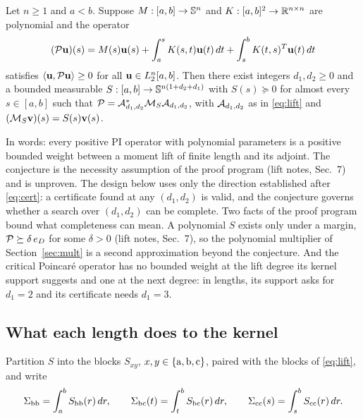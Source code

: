 \begin{conjecture}\label{conj}
Let $n\ge1$ and $a<b$. Suppose $M:[a,b]\to\mathbb{S}^n$ and $K:[a,b]^2\to\mathbb{R}^{n\times n}$ are polynomial and the operator
\[
(\mathcal{P}\mathbf{u})(s)=M(s)\mathbf{u}(s)+\int_a^sK(s,t)\mathbf{u}(t)\,dt+\int_s^bK(t,s)^T\mathbf{u}(t)\,dt
\]
satisfies $\left\langle \mathbf{u},\mathcal{P}\mathbf{u}\right\rangle\ge0$ for all $\mathbf{u}\in L_2^n[a,b]$. Then there exist integers $d_1,d_2\ge0$ and a bounded measurable $S:[a,b]\to\mathbb{S}^{n(1+d_2+d_1)}$ with $S(s)\succeq0$ for almost every $s\in[a,b]$ such that $\mathcal{P}=\mathcal{A}_{d_1,d_2}^*\mathcal{M}_S\mathcal{A}_{d_1,d_2}$, with $\mathcal{A}_{d_1,d_2}$ as in \eqref{eq:lift} and $(\mathcal{M}_S\mathbf{v})(s)=S(s)\mathbf{v}(s)$.
\end{conjecture}
In words: every positive PI operator with polynomial parameters is a positive bounded weight between a moment lift of finite length and its adjoint. The conjecture is the necessity assumption of the proof program (lift notes, Sec.~7) and is unproven. The design below uses only the direction established after \eqref{eq:cert}: a certificate found at any $(d_1,d_2)$ is valid, and the conjecture governs whether a search over $(d_1,d_2)$ can be complete. Two facts of the proof program bound what completeness can mean. A polynomial $S$ exists only under a margin, $\mathcal{P}\succeq\delta\,e_D$ for some $\delta>0$ (lift notes, Sec.~7), so the polynomial multiplier of Section~\ref{sec:mult} is a second approximation beyond the conjecture. And the critical Poincar\'e operator has no bounded weight at the lift degree its kernel support suggests and one at the next degree: in lengths, its support asks for $d_1=2$ and its certificate needs $d_1=3$.

\subsection{What each length does to the kernel}

Partition $S$ into the blocks $S_{xy}$, $x,y\in\{\mathrm{a},\mathrm{b},\mathrm{c}\}$, paired with the blocks of \eqref{eq:lift}, and write
\[
\Sigma_{\mathrm{b}\mathrm{b}}=\int_a^bS_{\mathrm{b}\mathrm{b}}(r)\,dr,\qquad \Sigma_{\mathrm{b}\mathrm{c}}(t)=\int_t^bS_{\mathrm{b}\mathrm{c}}(r)\,dr,\qquad \Sigma_{\mathrm{c}\mathrm{c}}(s)=\int_s^bS_{\mathrm{c}\mathrm{c}}(r)\,dr .
\]

